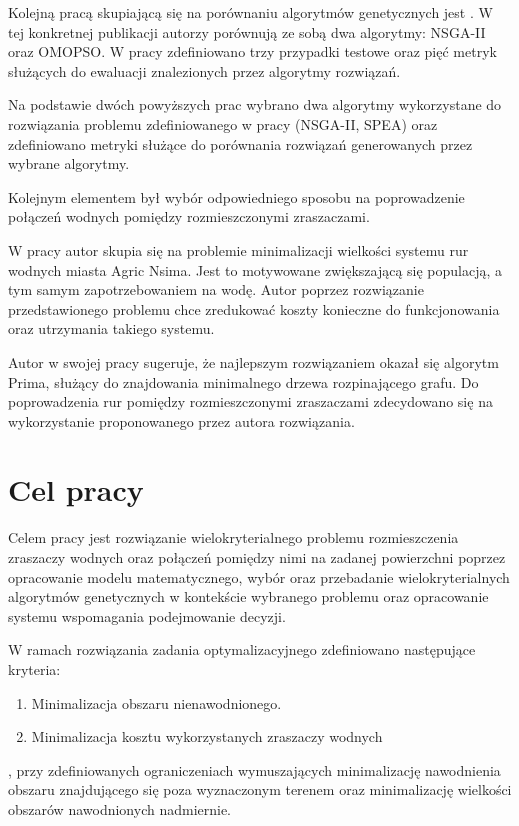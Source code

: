 \documentclass[twoside]{iisthesis}
\begin{document}
Kolejną pracą skupiającą się na porównaniu algorytmów genetycznych jest \cite{comparison_2}. W tej konkretnej publikacji autorzy porównują ze sobą dwa algorytmy: NSGA-II oraz OMOPSO. W pracy zdefiniowano trzy przypadki testowe oraz pięć metryk służących do ewaluacji znalezionych przez algorytmy rozwiązań.

Na podstawie dwóch powyższych prac wybrano dwa algorytmy wykorzystane do rozwiązania problemu zdefiniowanego w pracy (NSGA-II, SPEA) oraz zdefiniowano metryki służące do porównania rozwiązań generowanych przez wybrane algorytmy.

Kolejnym elementem był wybór odpowiedniego sposobu na poprowadzenie połączeń wodnych pomiędzy rozmieszczonymi zraszaczami.

W pracy \cite{pipes} autor skupia się na problemie minimalizacji wielkości systemu rur wodnych miasta Agric Nsima. Jest to motywowane zwiększającą się populacją, a tym samym zapotrzebowaniem na wodę. Autor poprzez rozwiązanie przedstawionego problemu chce zredukować koszty konieczne do funkcjonowania oraz utrzymania takiego systemu.

Autor w swojej pracy sugeruje, że najlepszym rozwiązaniem okazał się algorytm Prima, służący do znajdowania minimalnego drzewa rozpinającego grafu. Do poprowadzenia rur pomiędzy rozmieszczonymi zraszaczami zdecydowano się na wykorzystanie proponowanego przez autora rozwiązania.

\section{Cel pracy}
Celem pracy jest rozwiązanie wielokryterialnego problemu rozmieszczenia zraszaczy wodnych oraz połączeń pomiędzy nimi na zadanej powierzchni poprzez opracowanie modelu matematycznego, wybór oraz przebadanie wielokryterialnych algorytmów genetycznych w kontekście wybranego problemu oraz opracowanie systemu wspomagania podejmowanie decyzji.

W ramach rozwiązania zadania optymalizacyjnego zdefiniowano następujące kryteria:
\begin{enumerate}
	\item Minimalizacja obszaru nienawodnionego.
	\item Minimalizacja kosztu wykorzystanych zraszaczy wodnych\\
\end{enumerate}
, przy zdefiniowanych ograniczeniach wymuszających minimalizację nawodnienia obszaru znajdującego się poza wyznaczonym terenem oraz minimalizację wielkości obszarów nawodnionych nadmiernie.
\end{document}

